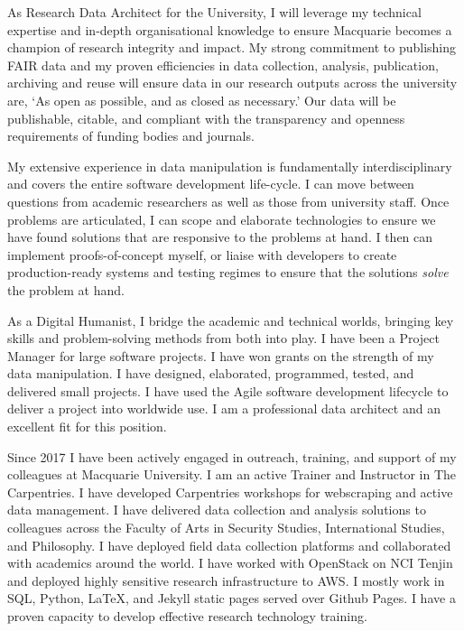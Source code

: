 \documentclass[11pt, a4paper]{awesome-cv}
\begin{document}
\begin{cvletter}

As Research Data Architect for the University, I will leverage my technical expertise and in-depth organisational knowledge to ensure Macquarie becomes a champion of research integrity and impact. My strong commitment to publishing FAIR data and my proven efficiencies in data collection, analysis, publication, archiving and reuse will ensure data in our research outputs across the university are, `As open as possible, and as closed as necessary.' Our data will be publishable, citable, and compliant with the transparency and openness requirements of funding bodies and journals.

My extensive experience in data manipulation is fundamentally interdisciplinary and covers the entire software development life-cycle. I can move between questions from academic researchers as well as those from university staff. Once problems are articulated, I can scope and elaborate technologies to ensure we have found solutions that are responsive to the problems at hand. I then can implement proofs-of-concept myself, or liaise with developers to create production-ready systems and testing regimes to ensure that the solutions \textit{solve} the problem at hand. 

As a Digital Humanist, I bridge the academic and technical worlds, bringing key skills and problem-solving methods from both into play. I have been a Project Manager for large software projects. I have won grants on the strength of my data manipulation. I have designed, elaborated, programmed, tested, and delivered small projects. I have used the Agile software development lifecycle to deliver a project into worldwide use. I am a professional data architect and an excellent fit for this position.


\newpage




Since 2017 I have been actively engaged in outreach, training, and support of my colleagues at Macquarie University. I am an active Trainer and Instructor in The Carpentries. I have developed Carpentries workshops for webscraping and active data management. I have delivered data collection and analysis solutions to colleagues across the Faculty of Arts in Security Studies, International Studies, and Philosophy. I have deployed field data collection platforms and collaborated with academics around the world. I have worked with OpenStack on NCI Tenjin and deployed highly sensitive research infrastructure to AWS. I mostly work in SQL, Python, \LaTeX{}, and Jekyll static pages served over Github Pages. I have a proven capacity to develop effective research technology training.



\end{cvletter}
\end{document}
